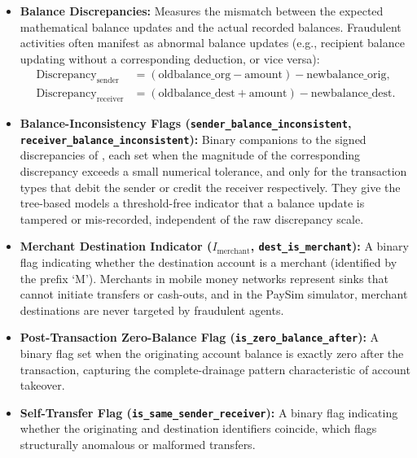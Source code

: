 \begin{itemize}
    \item \textbf{Balance Discrepancies:} Measures the mismatch between the expected mathematical balance updates and the actual recorded balances. Fraudulent activities often manifest as abnormal balance updates (e.g., recipient balance updating without a corresponding deduction, or vice versa):
    \begin{align}
        \text{Discrepancy}_{\text{sender}}   &= (\text{oldbalance\_org} - \text{amount}) - \text{newbalance\_orig}, \label{eq:disc-sender}\\
        \text{Discrepancy}_{\text{receiver}} &= (\text{oldbalance\_dest} + \text{amount}) - \text{newbalance\_dest}. \label{eq:disc-receiver}
    \end{align}
    \item \textbf{Balance-Inconsistency Flags (\texttt{sender\_balance\_inconsistent}, \texttt{receiver\_balance\_inconsistent}):} Binary companions to the signed discrepancies of , each set when the magnitude of the corresponding discrepancy exceeds a small numerical tolerance, and only for the transaction types that debit the sender or credit the receiver respectively. They give the tree-based models a threshold-free indicator that a balance update is tampered or mis-recorded, independent of the raw discrepancy scale.
    \item \textbf{Merchant Destination Indicator ($I_{\text{merchant}}$, \texttt{dest\_is\_merchant}):} A binary flag indicating whether the destination account is a merchant (identified by the prefix `M'). Merchants in mobile money networks represent sinks that cannot initiate transfers or cash-outs, and in the PaySim simulator, merchant destinations are never targeted by fraudulent agents.
    \item \textbf{Post-Transaction Zero-Balance Flag (\texttt{is\_zero\_balance\_after}):} A binary flag set when the originating account balance is exactly zero after the transaction, capturing the complete-drainage pattern characteristic of account takeover.
    \item \textbf{Self-Transfer Flag (\texttt{is\_same\_sender\_receiver}):} A binary flag indicating whether the originating and destination identifiers coincide, which flags structurally anomalous or malformed transfers.
\end{itemize}


